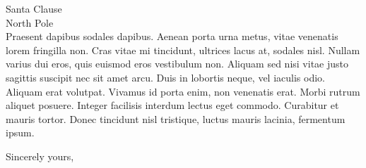 \documentclass[12pt]{letter}
\begin{document}
\begin{letter}{Santa Clause \\
North Pole \\
}
Praesent dapibus sodales dapibus. Aenean porta urna metus, vitae
venenatis lorem fringilla non. Cras vitae mi tincidunt, ultrices lacus
at, sodales nisl. Nullam varius dui eros, quis euismod eros vestibulum
non. Aliquam sed nisi vitae justo sagittis suscipit nec sit amet
arcu. Duis in lobortis neque, vel iaculis odio. Aliquam erat
volutpat. Vivamus id porta enim, non venenatis erat. Morbi rutrum
aliquet posuere. Integer facilisis interdum lectus eget
commodo. Curabitur et mauris tortor. Donec tincidunt nisl tristique,
luctus mauris lacinia, fermentum ipsum.

\closing{Sincerely yours,}





\end{letter}
\end{document}
